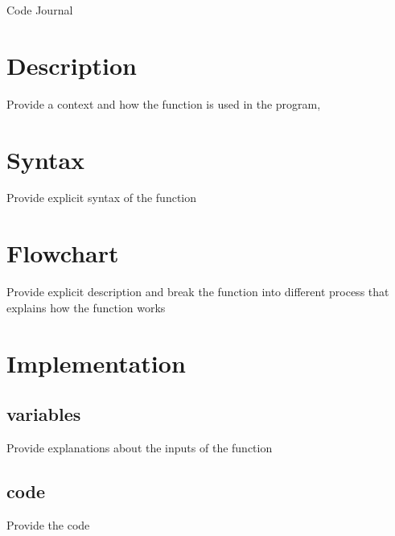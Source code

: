 \documentclass[12pt,a4paper]{article}
\begin{document}
\begin{huge}
\begin{center}
Code Journal
\end{center}
\end{huge}

\vspace{1cm}
\section{Description}
Provide a context and how the function is used in the program, 

\section{Syntax}
Provide explicit syntax of the function 

\section{Flowchart}
Provide explicit description and break the function into different process that explains how the function works


\section{Implementation}

\subsection{variables}
Provide explanations about the inputs of the function
\subsection{code}
Provide the code
\end{document}
